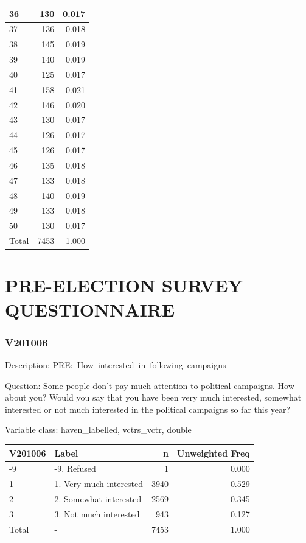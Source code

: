 \documentclass[
]{krantz}
\begin{document}
\begin{tabular}[t]{l|r|r}
36 & 130 & 0.017\\
\hline
37 & 136 & 0.018\\
\hline
38 & 145 & 0.019\\
\hline
39 & 140 & 0.019\\
\hline
40 & 125 & 0.017\\
\hline
41 & 158 & 0.021\\
\hline
42 & 146 & 0.020\\
\hline
43 & 130 & 0.017\\
\hline
44 & 126 & 0.017\\
\hline
45 & 126 & 0.017\\
\hline
46 & 135 & 0.018\\
\hline
47 & 133 & 0.018\\
\hline
48 & 140 & 0.019\\
\hline
49 & 133 & 0.018\\
\hline
50 & 130 & 0.017\\
\hline
Total & 7453 & 1.000\\
\hline
\end{tabular}

\hypertarget{pre-election-survey-questionnaire}{%
\section{PRE-ELECTION SURVEY QUESTIONNAIRE}\label{pre-election-survey-questionnaire}}

\hypertarget{v201006}{%
\subsubsection*{V201006}\label{v201006}}


Description: PRE:~How~interested~in~following~campaigns

Question: Some people don't pay much attention to political campaigns. How about you? Would you say that you have been very much interested, somewhat interested or not much interested in the political campaigns so far this year?

Variable class: haven\_labelled, vctrs\_vctr, double

\begin{tabular}[t]{l|l|r|r}
\hline
V201006 & Label & n & Unweighted Freq\\
\hline
-9 & -9. Refused & 1 & 0.000\\
\hline
1 & 1. Very much interested & 3940 & 0.529\\
\hline
2 & 2. Somewhat interested & 2569 & 0.345\\
\hline
3 & 3. Not much interested & 943 & 0.127\\
\hline
Total & - & 7453 & 1.000\\
\hline
\end{tabular}
\end{document}
